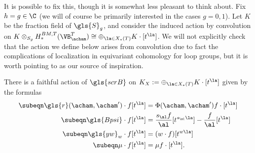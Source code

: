 It is possible to fix this, though it is somewhat less pleasant to
think about. Fix $h=g\in \C$ (we will of course be primarily interested in the cases $g=0,1$).  Let $K$ be the fraction field of $\gls{S}_g$, and consider
the induced action by convolution on $K\otimes_{S_g}
H_*^{BM,T}(\VB_{\acham}^T)\cong \oplus_{\la\in X_*(T)}K\cdot
[t^\la]$.  We will not explicitly check that the action we define
below arises from convolution due to fact the complications of
localization in equivariant cohomology for loop groups, but it is
worth pointing to as our source of inspiration.
  \begin{lemma}\label{lem:frac-rep}
There is a faithful action of $\gls{scrB}$  on $K_X:=  \oplus_{\la\in X_*(T)}K\cdot [t^\la]$
given by  the formulas \newseq\begin{align*}
\subeqn\label{eq:ract-frac}
\gls{r}   (\acham,\acham') \cdot f [t^\la]&=\Phi(\acham,\acham') f\cdot
                                           [t^\la]\\
\subeqn\label{eq:psiact-frac}
\gls{Bpsi}\cdot f [t^\la]&=\frac{s_{\al}f}{\al}[t^{s_{\al}\la}]-\frac{f}{\al}[t^{\la}]\\
   \subeqn\label{eq:wact-frac}
\gls{yw}_w\cdot f[t^\la]&=(w\cdot f)[t^{w\la}]\\
     \subeqn\label{eq:muact-frac}
\mu \cdot f [t^\la]&=\mu f\cdot [t^\la].
  \end{align*} 
  \end{lemma}



